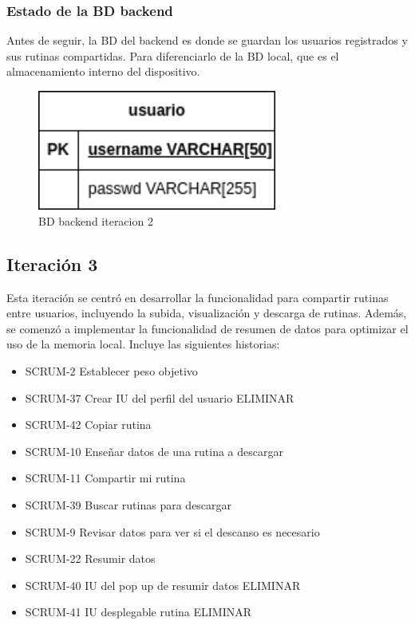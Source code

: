 \subsubsection{Estado de la BD backend} 

Antes de seguir, la BD del backend es donde se guardan los usuarios registrados y sus rutinas compartidas. Para diferenciarlo de la BD local, que es el almacenamiento interno del dispositivo.

\begin{figure}[H]
   \centering
    \includegraphics[width=0.7\textwidth]{fotos/BD be iteracion 2.png}
    \caption{BD backend iteracion 2}
    \label{fig:BD backend iteracion 2}
\end{figure}

\subsection{Iteración 3}
Esta iteración se centró en desarrollar la funcionalidad para compartir rutinas entre usuarios, incluyendo la subida, visualización y descarga de rutinas. Además, se comenzó a implementar la funcionalidad de resumen de datos para optimizar el uso de la memoria local. Incluye las siguientes historias:

\begin{itemize}
  \item SCRUM-2 Establecer peso objetivo
  \item SCRUM-37 Crear IU del perfil del usuario ELIMINAR
  \item SCRUM-42 Copiar rutina
  \item SCRUM-10 Enseñar datos de una rutina a descargar
  \item SCRUM-11 Compartir mi rutina
  \item SCRUM-39 Buscar rutinas para descargar
  \item SCRUM-9 Revisar datos para ver si el descanso es necesario
  \item SCRUM-22 Resumir datos
  \item SCRUM-40 IU del pop up de resumir datos ELIMINAR
  \item SCRUM-41 IU desplegable rutina ELIMINAR
\end{itemize}


